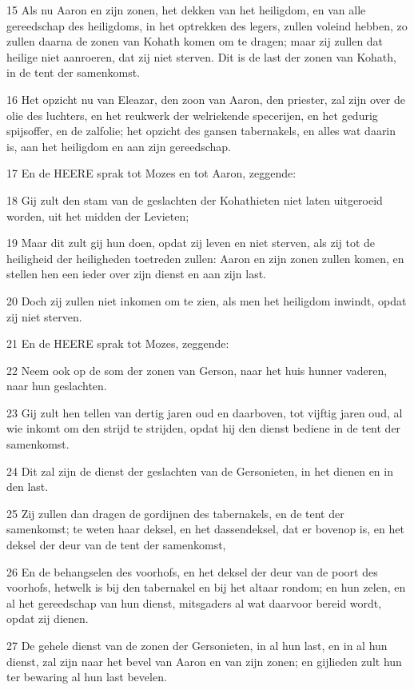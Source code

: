 \par 15 Als nu Aaron en zijn zonen, het dekken van het heiligdom, en van alle gereedschap des heiligdoms, in het optrekken des legers, zullen voleind hebben, zo zullen daarna de zonen van Kohath komen om te dragen; maar zij zullen dat heilige niet aanroeren, dat zij niet sterven. Dit is de last der zonen van Kohath, in de tent der samenkomst.
\par 16 Het opzicht nu van Eleazar, den zoon van Aaron, den priester, zal zijn over de olie des luchters, en het reukwerk der welriekende specerijen, en het gedurig spijsoffer, en de zalfolie; het opzicht des gansen tabernakels, en alles wat daarin is, aan het heiligdom en aan zijn gereedschap.
\par 17 En de HEERE sprak tot Mozes en tot Aaron, zeggende:
\par 18 Gij zult den stam van de geslachten der Kohathieten niet laten uitgeroeid worden, uit het midden der Levieten;
\par 19 Maar dit zult gij hun doen, opdat zij leven en niet sterven, als zij tot de heiligheid der heiligheden toetreden zullen: Aaron en zijn zonen zullen komen, en stellen hen een ieder over zijn dienst en aan zijn last.
\par 20 Doch zij zullen niet inkomen om te zien, als men het heiligdom inwindt, opdat zij niet sterven.
\par 21 En de HEERE sprak tot Mozes, zeggende:
\par 22 Neem ook op de som der zonen van Gerson, naar het huis hunner vaderen, naar hun geslachten.
\par 23 Gij zult hen tellen van dertig jaren oud en daarboven, tot vijftig jaren oud, al wie inkomt om den strijd te strijden, opdat hij den dienst bediene in de tent der samenkomst.
\par 24 Dit zal zijn de dienst der geslachten van de Gersonieten, in het dienen en in den last.
\par 25 Zij zullen dan dragen de gordijnen des tabernakels, en de tent der samenkomst; te weten haar deksel, en het dassendeksel, dat er bovenop is, en het deksel der deur van de tent der samenkomst,
\par 26 En de behangselen des voorhofs, en het deksel der deur van de poort des voorhofs, hetwelk is bij den tabernakel en bij het altaar rondom; en hun zelen, en al het gereedschap van hun dienst, mitsgaders al wat daarvoor bereid wordt, opdat zij dienen.
\par 27 De gehele dienst van de zonen der Gersonieten, in al hun last, en in al hun dienst, zal zijn naar het bevel van Aaron en van zijn zonen; en gijlieden zult hun ter bewaring al hun last bevelen.
